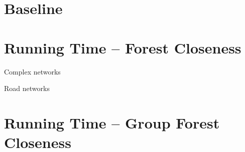 
\section{Baseline}
\label{apx:el-clos:baseline}
\begin{table}[H]
\footnotesize
{}
\label{tab:el-clos:lamg-pinv-prec}

\end{table}

\section{Running Time -- Forest Closeness}
\label{apx:el-clos:forest-time}
\begin{table}[H]
\setlength{\tabcolsep}{2pt}
\centering\footnotesize
{}
\label{tab:el-clos:forest-time}

\begin{subtable}[t]{.5\textwidth}
\centering
\caption{Complex networks}

\end{subtable}\hfill
\begin{subtable}[t]{.5\textwidth}
\centering
\caption{Road networks}

\end{subtable}
\end{table}

\section{Running Time -- Group Forest Closeness}
\label{apx:el-clos:group-forest-time}
\begin{table}[H]
\centering\small
{}
\label{tab:el-clos:time-group-forest}

\end{table}
